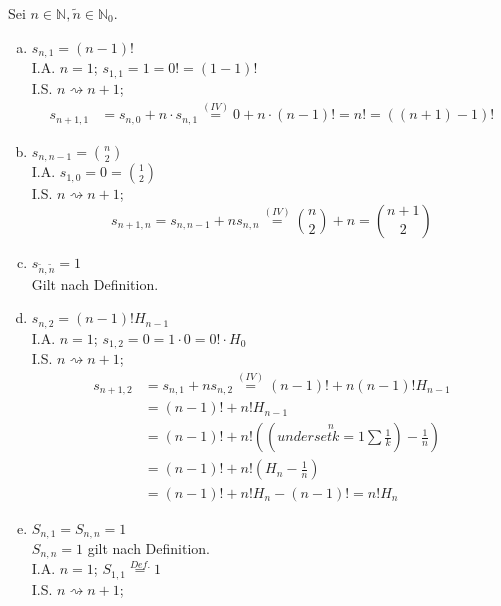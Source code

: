 \documentclass[11pt,a4paper,ngerman]{article}
\begin{document}
Sei $n \in \mathbb{N}, \tilde{n} \in \mathbb{N}_0$.
\begin{enumerate}[a)]
\item $s_{n,1} = (n-1)!$ \\
I.A. $n=1$; $s_{1,1} = 1 = 0! = (1-1)!$ \\
I.S. $n \rightsquigarrow n+1$;
  \begin{equation*}\begin{split}
    s_{n+1,1} &= s_{n,0} + n \cdot s_{n,1} 
              \stackrel{(IV)}{=} 0 + n \cdot (n-1)! 
              = n! = ((n+1)-1)!
  \end{split}\end{equation*}
\item $s_{n,n-1} = \binom{n}{2}$ \\
I.A. $s_{1,0} = 0 = \binom{1}{2}$ \\
I.S. $n \rightsquigarrow n+1$;
  \begin{equation*}s_{n+1,n} = s_{n,n-1} + n s_{n,n} \stackrel{(IV)}{=} \binom{n}{2} + n = \binom{n+1}{2}\end{equation*}
\item $s_{\tilde{n},\tilde{n}} = 1$ \\
Gilt nach Definition.
\item $s_{n,2} = (n-1)! H_{n-1}$ \\
I.A. $n=1$; $s_{1,2} = 0 = 1 \cdot 0 = 0! \cdot H_{0} $ \\
I.S. $n \rightsquigarrow n+1$;
  \begin{equation*}\begin{split}
    s_{n+1,2} &= s_{n,1} + n s_{n,2} \stackrel{(IV)}{=} (n-1)! + n (n-1)! H_{n-1} \\
              &=  (n-1)! + n! H_{n-1}\\
              &= (n-1)! + n! ((\overset{n}{underset{k=1}{\sum}} \frac{1}{k}) - \frac{1}{n})\\
              &= (n-1)! + n! (H_n - \frac{1}{n})\\
              &= (n-1)! + n!H_n - (n-1)! = n!H_n
  \end{split}\end{equation*}
\item $S_{n,1} = S_{n,n} = 1$ \\
$S_{n,n} = 1$ gilt nach Definition. \\
I.A. $n=1$; $S_{1,1} \stackrel{Def.}{=} 1 $ \\
I.S. $n \rightsquigarrow n+1$;
  \begin{equation*}\begin{split}

\end{split}
\end{equation*}
\end{enumerate}
\end{document}
